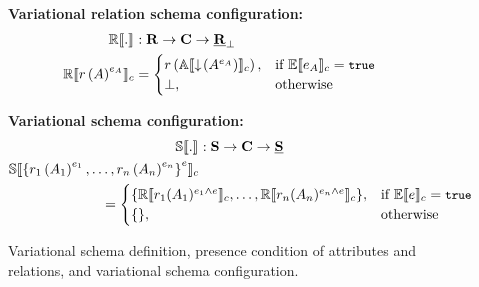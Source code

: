 \begin{figure}
%
\medskip
\textbf{Variational relation schema configuration:}
\begin{alignat*}{1}%
\orSem [] . &: \vRelSchSet \to \confSet  \to \maybe \pRelSchSet\\
%
\orSem {\vRelDef [\vRel] [\dimMeta_\vAttList]} &= 
	\begin{cases}
		\vRel\left({\olSem {\pushIn { \annot [\dimMeta_\vAttList] \vAttList}}}\right), &\If \fSem {\dimMeta_\vAttList} = \t\\
		\bot, &\Otherwise
	\end{cases}
\end{alignat*}

%
\medskip
\textbf{Variational schema configuration:}
\begin{alignat*}{1}%
\osSem [] . &: \vSchSet \to \confSet \to \pSchSet\\
%
\osSem {\annot [\dimMeta] {\setDef {\vRelDefNum 1, \ldots, \vRelDefNum \numRels}}}\\
&\hspace{-70pt}= \begin{cases}
                 \setDef {\orSem {\vRel_1( \vAttList_1 )^{\dimMeta_1 {\wedge \dimMeta}} }, \ldots, 
                 \orSem {\vRel_\numRels( \vAttList_\numRels)^{\dimMeta_\numRels {\wedge \dimMeta}} }},	
                         & \If \fSem {\dimMeta } =\t \\	
        \setDef{}, & \text{otherwise}
	\end{cases}
\end{alignat*}


\caption{Variational schema definition, presence condition of attributes and relations, and variational schema configuration.}
\label{fig:vsch}
\end{figure} 

